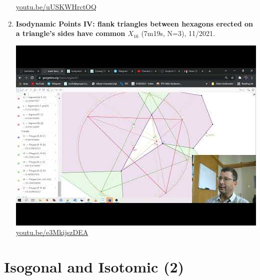 \documentclass[12pt]{amsart}
\begin{document}
\begin{enumerate}[resume]
\begin{center}
\href{https://youtu.be/uUSKWHrctOQ}{\url{youtu.be/uUSKWHrctOQ}}\end{center}
% 
\item \textbf{Isodynamic Points IV: flank triangles between hexagons erected on a triangle's sides have common $X_{16}$} (7m19s, N=3), 11/2021. 
\begin{center}\includegraphics[width=.5\textwidth]{pics/e3MkijszDEA.jpg} \\ 
\href{https://youtu.be/e3MkijszDEA}{\url{youtu.be/e3MkijszDEA}}\end{center}
% 
\end{enumerate}

\section{Isogonal and Isotomic (2)}
\end{document}
